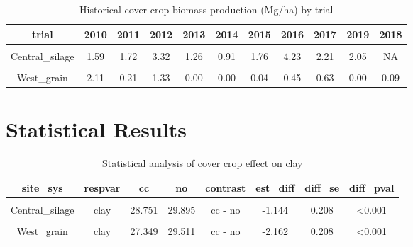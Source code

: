 \documentclass[
]{article}
\begin{document}
\begin{table}[H]

\caption{\label{tab:ccbio}Historical cover crop biomass production (Mg/ha) by trial}
\centering
\begin{tabular}[t]{ccccccccccc}
\toprule
trial & 2010 & 2011 & 2012 & 2013 & 2014 & 2015 & 2016 & 2017 & 2019 & 2018\\
\midrule
\cellcolor{gray!6}{Central\_grain} & \cellcolor{gray!6}{0.86} & \cellcolor{gray!6}{0.28} & \cellcolor{gray!6}{1.37} & \cellcolor{gray!6}{0.25} & \cellcolor{gray!6}{0.47} & \cellcolor{gray!6}{0.61} & \cellcolor{gray!6}{2.22} & \cellcolor{gray!6}{2.76} & \cellcolor{gray!6}{1.29} & \cellcolor{gray!6}{NA}\\
Central\_silage & 1.59 & 1.72 & 3.32 & 1.26 & 0.91 & 1.76 & 4.23 & 2.21 & 2.05 & NA\\
\cmidrule{1-11}
\cellcolor{gray!6}{East\_grain} & \cellcolor{gray!6}{2.11} & \cellcolor{gray!6}{1.46} & \cellcolor{gray!6}{0.00} & \cellcolor{gray!6}{0.92} & \cellcolor{gray!6}{0.00} & \cellcolor{gray!6}{0.36} & \cellcolor{gray!6}{0.51} & \cellcolor{gray!6}{7.30} & \cellcolor{gray!6}{0.30} & \cellcolor{gray!6}{0.19}\\
West\_grain & 2.11 & 0.21 & 1.33 & 0.00 & 0.00 & 0.04 & 0.45 & 0.63 & 0.00 & 0.09\\
\bottomrule
\end{tabular}
\end{table}

\newpage

\hypertarget{statistical-results}{%
\section{Statistical Results}\label{statistical-results}}

\begin{table}[H]

\caption{\label{tab:clay}Statistical analysis of cover crop effect on clay}
\centering
\begin{tabular}[t]{cccccccc}
\toprule
site\_sys & respvar & cc & no & contrast & est\_diff & diff\_se & diff\_pval\\
\midrule
\cellcolor{gray!6}{Central\_grain} & \cellcolor{gray!6}{clay} & \cellcolor{gray!6}{27.740} & \cellcolor{gray!6}{28.000} & \cellcolor{gray!6}{cc - no} & \cellcolor{gray!6}{-0.260} & \cellcolor{gray!6}{0.186} & \cellcolor{gray!6}{0.164}\\
Central\_silage & clay & 28.751 & 29.895 & cc - no & -1.144 & 0.208 & <0.001\\
\cellcolor{gray!6}{East\_grain} & \cellcolor{gray!6}{clay} & \cellcolor{gray!6}{31.730} & \cellcolor{gray!6}{34.606} & \cellcolor{gray!6}{cc - no} & \cellcolor{gray!6}{-2.876} & \cellcolor{gray!6}{0.208} & \cellcolor{gray!6}{<0.001}\\
West\_grain & clay & 27.349 & 29.511 & cc - no & -2.162 & 0.208 & <0.001\\
\bottomrule
\end{tabular}
\end{table}
\end{document}
